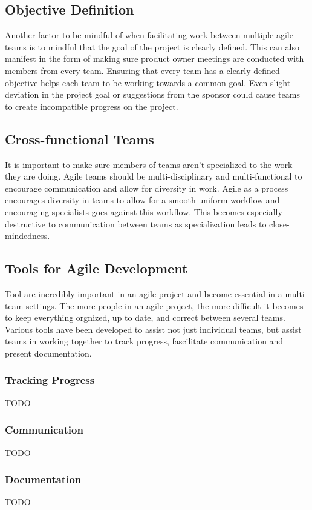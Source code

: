 \documentclass[sigplan,screen]{acmart}
\begin{document}
\subsection{Objective Definition}
Another factor to be mindful of when facilitating work between multiple agile teams is to mindful that the goal of the project is clearly defined. This can also manifest in the form of making sure product owner meetings are conducted  with members from every team. Ensuring that every team has a clearly defined objective helps each team to be working towards a common goal. Even slight deviation in the project goal or suggestions from the sponsor could cause teams to create incompatible progress on the project.

\subsection{Cross-functional Teams}
It is important to make sure members of teams aren't specialized to the work they are doing. Agile teams should be multi-disciplinary and multi-functional to encourage communication and allow for diversity in work. Agile as a process encourages diversity in teams to allow for a smooth uniform workflow and encouraging specialists goes against this workflow. This becomes especially destructive to communication between teams as specialization leads to close-mindedness.

\subsection{Tools for Agile Development}
Tool are incredibly important in an agile project and become essential in a multi-team settings. The more people in an agile project, the more difficult it becomes to keep everything orgnized, up to date, and correct between several teams. Various tools have been developed to assist not just individual teams, but assist teams in working together to track progress, fascilitate communication and present documentation.

\subsubsection{Tracking Progress}
TODO

\subsubsection{Communication}
TODO

\subsubsection{Documentation}
TODO
\end{document}
